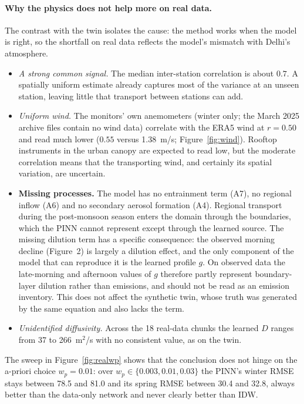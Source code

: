 \documentclass[11pt,a4paper]{article}
\begin{document}
\paragraph{Why the physics does not help more on real data.} The contrast with the twin isolates the cause: the
method works when the model is right, so the shortfall on real data reflects the model's mismatch with Delhi's atmosphere.
\begin{itemize}
\item \emph{A strong common signal.} The median inter-station correlation is about $0.7$. A spatially uniform estimate
already captures most of the variance at an unseen station, leaving little that transport between stations can add.
\item \emph{Uniform wind.} The monitors' own anemometers (winter only; the March 2025 archive files contain no wind data)
correlate with the ERA5 wind at $r=0.50$ and read much lower ($0.55$ versus \SI{1.38}{m/s}; Figure~\ref{fig:wind}).
Rooftop instruments in the urban canopy are expected to read low, but the moderate correlation means that the
transporting wind, and certainly its spatial variation, are uncertain.
\item \textbf{Missing processes.} The model has no entrainment term (A7), no
  regional inflow (A6) and no secondary aerosol formation (A4). Regional
  transport during the post-monsoon season enters the domain through the
  boundaries, which the PINN cannot represent except through the learned
  source. The missing dilution term has a specific consequence: the observed
  morning decline (Figure~2) is largely a dilution effect, and the only
  component of the model that can reproduce it is the learned profile $g$.
  On observed data the late-morning and afternoon values of $g$ therefore
  partly represent boundary-layer dilution rather than emissions, and should
  not be read as an emission inventory. This does not affect the synthetic
  twin, whose truth was generated by the same equation and also lacks the term.
\item \emph{Unidentified diffusivity.} Across the 18 real-data chunks the learned $D$ ranges from 37 to 266~m$^2$/s with
no consistent value, as on the twin.
\end{itemize}
The sweep in Figure~\ref{fig:realwp} shows that the conclusion does not hinge on the a-priori choice $w_p=0.01$: over
$w_p\in\{0.003,0.01,0.03\}$ the PINN's winter RMSE stays between 78.5 and 81.0 and its spring RMSE between 30.4 and 32.8,
always better than the data-only network and never clearly better than IDW.
\end{document}
